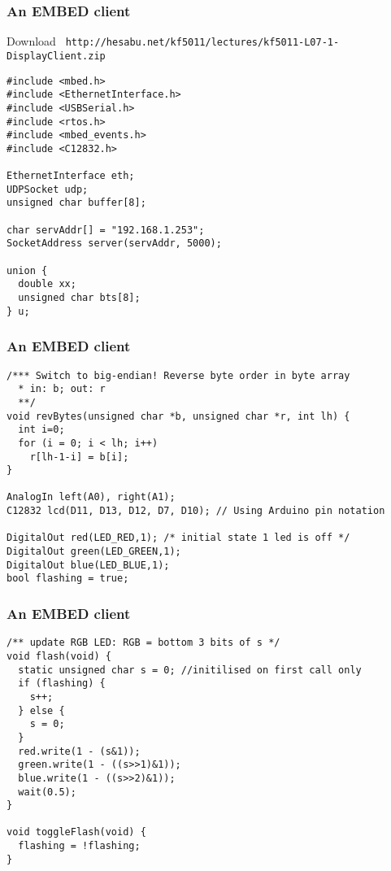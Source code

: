 \documentclass[10pt, hyperref={pdfpagelabels=false}]{beamer}
\begin{document}
\begin{frame} [fragile]
\frametitle{An EMBED client}
Download \texttt{\color{blue} \small http://hesabu.net/kf5011/lectures/kf5011-L07-1-DisplayClient.zip}

\footnotesize \color{brown}
\begin{verbatim}
#include <mbed.h>
#include <EthernetInterface.h>
#include <USBSerial.h>
#include <rtos.h>
#include <mbed_events.h>
#include <C12832.h>

EthernetInterface eth;
UDPSocket udp;
unsigned char buffer[8];

char servAddr[] = "192.168.1.253";
SocketAddress server(servAddr, 5000);

union {
  double xx;
  unsigned char bts[8];
} u;
\end{verbatim}
\end{frame}

\begin{frame} [fragile]
\frametitle{An EMBED client}
\footnotesize \color{brown}
\begin{verbatim}
/*** Switch to big-endian! Reverse byte order in byte array
  * in: b; out: r
  **/
void revBytes(unsigned char *b, unsigned char *r, int lh) {
  int i=0;
  for (i = 0; i < lh; i++)
    r[lh-1-i] = b[i];
}

AnalogIn left(A0), right(A1);
C12832 lcd(D11, D13, D12, D7, D10); // Using Arduino pin notation

DigitalOut red(LED_RED,1); /* initial state 1 led is off */
DigitalOut green(LED_GREEN,1);
DigitalOut blue(LED_BLUE,1);
bool flashing = true;
\end{verbatim}
\end{frame}

\begin{frame} [fragile]
\frametitle{An EMBED client}
\footnotesize \color{brown}
\begin{verbatim}
/** update RGB LED: RGB = bottom 3 bits of s */
void flash(void) {
  static unsigned char s = 0; //initilised on first call only
  if (flashing) {
    s++;
  } else {
    s = 0;
  }
  red.write(1 - (s&1));
  green.write(1 - ((s>>1)&1));
  blue.write(1 - ((s>>2)&1));
  wait(0.5);
}

void toggleFlash(void) {
  flashing = !flashing;
}
\end{verbatim}
\end{frame}
\end{document}
